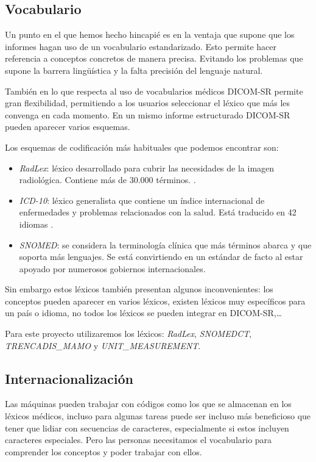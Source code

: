 \subsection{Vocabulario}\label{dicomsr:vocabulario}
Un punto en el que hemos hecho hincapié es en la ventaja que supone que los informes hagan uso de un vocabulario estandarizado. Esto permite hacer referencia a conceptos concretos de manera precisa. Evitando los problemas que supone la barrera lingüística y la falta precisión del lenguaje natural.\medskip\par
También en lo que respecta al uso de vocabularios médicos DICOM-SR permite gran flexibilidad, permitiendo a los usuarios seleccionar el léxico que más les convenga en cada momento. En un mismo informe estructurado DICOM-SR pueden aparecer varios esquemas.\par
Los esquemas de codificación más habituales que podemos encontrar son: 
\begin{itemize}
	\item \emph{RadLex}: léxico desarrollado para cubrir las necesidades de la imagen radiológica. Contiene más de 30.000 términos. \cite{langlotz2006radlex}.
	\item \emph{ICD-10}: léxico generalista que contiene un índice internacional de enfermedades y problemas relacionados con la salud. Está traducido en 42 idiomas \cite{world2004icd}.
	\item \emph{SNOMED}: se considera la terminología clínica que más términos abarca y que soporta más lenguajes.\cite{stearns2001snomed} Se está convirtiendo en un estándar de facto al estar apoyado por numerosos gobiernos internacionales. \cite{snomed-gov}
\end{itemize}
\medskip\par
Sin embargo estos léxicos también presentan algunos inconvenientes: los conceptos pueden aparecer en varios léxicos, existen léxicos muy específicos para un país o idioma, no todos los léxicos se pueden integrar en DICOM-SR,\ldots\medskip\par
Para este proyecto utilizaremos los léxicos: \emph{RadLex}, \emph{SNOMED\-CT}, \emph{TRENCADIS\_MAMO} y \emph{UNIT\_MEASUREMENT}.\par
	
\subsection{Internacionalización}\label{dicomsr:internacionalizacion}
Las máquinas pueden trabajar con códigos como los que se almacenan en los léxicos médicos, incluso para algunas tareas puede ser incluso más beneficioso que tener que lidiar con secuencias de caracteres, especialmente si estos incluyen caracteres especiales. Pero las personas necesitamos el vocabulario para comprender los conceptos y poder trabajar con ellos.\medskip \par


